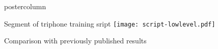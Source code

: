 \documentclass[final,hyperref={pdfpagelabels=false}]{beamer}
\newlength{\columnheight}
\begin{document}
\begin{frame}[fragile]
\begin{columns}
    \begin{column}{.33\textwidth}
      \begin{beamercolorbox}[center,wd=\textwidth]{postercolumn}
        \begin{minipage}[T]{.95\textwidth} %
          \parbox[t][\columnheight]{\textwidth}{ %

            \begin{block}{Segment of triphone training sript}
                  \texttt{[image: script-lowlevel.pdf]} 
            \end{block}
            \vfill
            \begin{block}{Comparison with previously published results}
              \begin{columns}
                \begin{column}{.5\textwidth}

\end{column}
\end{columns}
\end{block}}
\end{minipage}
\end{beamercolorbox}
\end{column}
\end{columns}
\end{frame}
\end{document}
